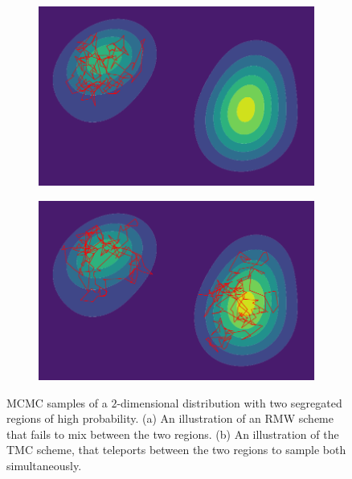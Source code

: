 \begin{figure} 
    \centering
    \begin{subfigure}[b]{0.47\textwidth}  
        \centering 
        \includegraphics[width=\textwidth]{figs_part1/mcmc/example_2D_dist_with_RMW}
        \caption[]%
        {}    
        \label{fig:example_2D_dist_with_RMW}
    \end{subfigure}
    \hfill
    \begin{subfigure}[b]{0.47\textwidth}
        \centering
        \includegraphics[width=\textwidth]{figs_part1/mcmc/example_2D_dist_with_TMC}
        \caption[]%
        {}    
        \label{fig:example_2D_dist_with_TMC}
    \end{subfigure}
    \caption[ ]
    {\small MCMC samples of a $2$-dimensional distribution with two segregated regions of high probability. (a) An illustration of an RMW scheme that fails to mix between the two regions. (b) An illustration of the TMC scheme, that teleports between the two regions to sample both simultaneously. }
\end{figure} 

